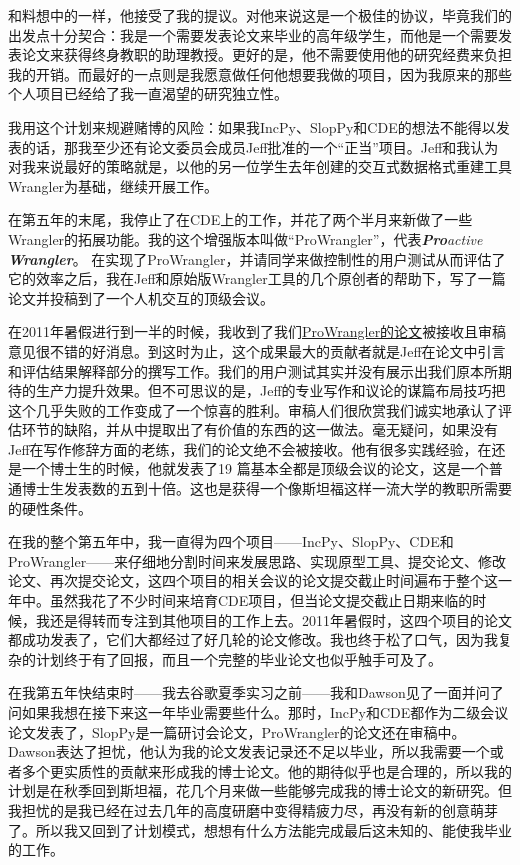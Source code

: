 \documentclass[letter,12pt]{book}
\begin{document}
\begin{CJK}{UTF8}{gbsn}
和料想中的一样，他接受了我的提议。对他来说这是一个极佳的协议，毕竟我们的出发点十分契合：我是一个需要发表论文来毕业的高年级学生，而他是一个需要发表论文来获得终身教职的助理教授。更好的是，他不需要使用他的研究经费来负担我的开销。而最好的一点则是我愿意做任何他想要我做的项目，因为我原来的那些个人项目已经给了我一直渴望的研究独立性。

我用这个计划来规避赌博的风险：如果我IncPy、SlopPy和CDE的想法不能得以发表的话，那我至少还有论文委员会成员Jeff批准的一个“正当”项目。Jeff和我认为对我来说最好的策略就是，以他的另一位学生去年创建的交互式数据格式重建工具Wrangler为基础，继续开展工作。

在第五年的末尾，我停止了在CDE上的工作，并花了两个半月来新做了一些Wrangler的拓展功能。我的这个增强版本叫做“ProWrangler”，代表\emph{\textbf{Pro}active \textbf{Wrangler}}。 在实现了ProWrangler，并请同学来做控制性的用户测试从而评估了它的效率之后，我在Jeff和原始版Wrangler工具的几个原创者的帮助下，写了一篇论文并投稿到了一个人机交互的顶级会议。

在2011年暑假进行到一半的时候，我收到了我们\href{http://www.pgbovine.net/projects/pubs/prowrangler_uist11_camera_ready.pdf}{ProWrangler的论文}被接收且审稿意见很不错的好消息。到这时为止，这个成果最大的贡献者就是Jeff在论文中引言和评估结果解释部分的撰写工作。我们的用户测试其实并没有展示出我们原本所期待的生产力提升效果。但不可思议的是，Jeff的专业写作和议论的谋篇布局技巧把这个几乎失败的工作变成了一个惊喜的胜利。审稿人们很欣赏我们诚实地承认了评估环节的缺陷，并从中提取出了有价值的东西的这一做法。毫无疑问，如果没有Jeff在写作修辞方面的老练，我们的论文绝不会被接收。他有很多实践经验，在还是一个博士生的时候，他就发表了19 篇基本全都是顶级会议的论文，这是一个普通博士生发表数的五到十倍。这也是获得一个像斯坦福这样一流大学的教职所需要的硬性条件。

\breakline

在我的整个第五年中，我一直得为四个项目——IncPy、SlopPy、CDE和ProWrangler——来仔细地分割时间来发展思路、实现原型工具、提交论文、修改论文、再次提交论文，这四个项目的相关会议的论文提交截止时间遍布于整个这一年中。虽然我花了不少时间来培育CDE项目，但当论文提交截止日期来临的时候，我还是得转而专注到其他项目的工作上去。2011年暑假时，这四个项目的论文都成功发表了，它们大都经过了好几轮的论文修改。我也终于松了口气，因为我复杂的计划终于有了回报，而且一个完整的毕业论文也似乎触手可及了。


在我第五年快结束时——我去谷歌夏季实习之前——我和Dawson见了一面并问了问如果我想在接下来这一年毕业需要些什么。那时，IncPy和CDE都作为二级会议论文发表了，SlopPy是一篇研讨会论文，ProWrangler的论文还在审稿中。Dawson表达了担忧，他认为我的论文发表记录还不足以毕业，所以我需要一个或者多个更实质性的贡献来形成我的博士论文。他的期待似乎也是合理的，所以我的计划是在秋季回到斯坦福，花几个月来做一些能够完成我的博士论文的新研究。但我担忧的是我已经在过去几年的高度研磨中变得精疲力尽，再没有新的创意萌芽了。所以我又回到了计划模式，想想有什么方法能完成最后这未知的、能使我毕业的工作。


\end{CJK}
\end{document}
